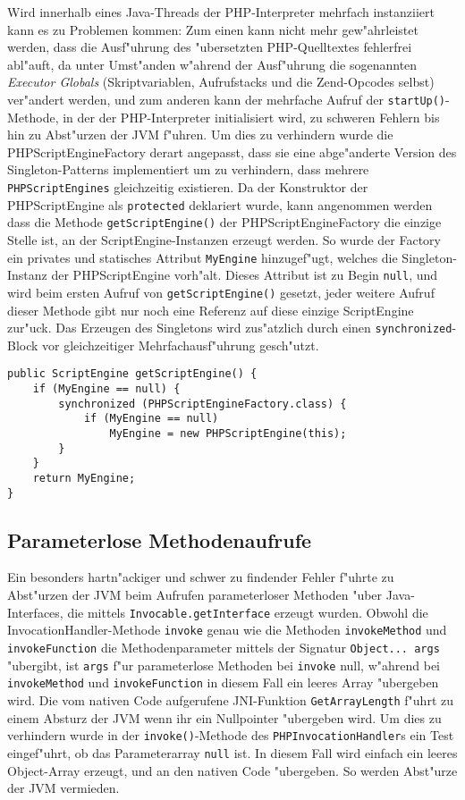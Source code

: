 Wird innerhalb eines Java-Threads der PHP-Interpreter mehrfach instanziiert kann es zu Problemen
kommen: Zum einen kann nicht mehr gew"ahrleistet werden, dass die Ausf"uhrung des "ubersetzten
PHP-Quelltextes fehlerfrei abl"auft, da unter Umst"anden w"ahrend der Ausf"uhrung die sogenannten
\emph{Executor Globals} (Skriptvariablen, Aufrufstacks und die Zend-Opcodes selbst) ver"andert werden,
und zum anderen kann der mehrfache Aufruf der \texttt{startUp()}-Methode, in der der PHP-Interpreter
initialisiert wird, zu schweren Fehlern bis hin zu Abst"urzen der JVM f"uhren. Um dies zu verhindern
wurde die PHPScriptEngineFactory derart angepasst, dass sie eine abge"anderte Version des Singleton-Patterns
implementiert um zu verhindern, dass mehrere \texttt{PHPScriptEngines} gleichzeitig existieren. 
Da der Konstruktor der PHPScriptEngine als \texttt{protected} deklariert wurde, kann angenommen werden dass die 
Methode \texttt{getScriptEngine()} der PHPScriptEngineFactory die einzige Stelle ist, an der
ScriptEngine-Instanzen erzeugt werden. So wurde der Factory ein privates und statisches Attribut \texttt{MyEngine} 
hinzugef"ugt, welches die Singleton-Instanz der PHPScriptEngine vorh"alt. Dieses Attribut ist zu Begin
\texttt{null}, und wird beim ersten Aufruf von \texttt{getScriptEngine()} gesetzt, jeder weitere Aufruf
dieser Methode gibt nur noch eine Referenz auf diese einzige ScriptEngine zur"uck. Das Erzeugen des
Singletons wird zus"atzlich durch einen \texttt{synchronized}-Block vor gleichzeitiger
Mehrfachausf"uhrung gesch"utzt.

\begin{lstlisting}[caption=Singleton-Erzeugung]
public ScriptEngine getScriptEngine() {
    if (MyEngine == null) {
        synchronized (PHPScriptEngineFactory.class) {
            if (MyEngine == null)
                MyEngine = new PHPScriptEngine(this);
        }
    }
    return MyEngine;
}
\end{lstlisting}

\subsection{Parameterlose Methodenaufrufe}
\label{sec:chap2:turp:params}

Ein besonders hartn"ackiger und schwer zu findender Fehler f"uhrte zu Abst"urzen der JVM beim Aufrufen
parameterloser Methoden "uber Java-Interfaces, die mittels \texttt{Invocable.getInterface} erzeugt wurden.
Obwohl die InvocationHandler-Methode \texttt{invoke} genau wie die Methoden \texttt{invokeMethod} und \texttt{invokeFunction}
die Methodenparameter mittels der Signatur \texttt{Object... args} "ubergibt, ist \texttt{args} f"ur parameterlose Methoden
bei \texttt{invoke} null, w"ahrend bei \texttt{invokeMethod} und \texttt{invokeFunction} in diesem Fall ein leeres Array 
"ubergeben wird. Die vom nativen Code aufgerufene JNI-Funktion \texttt{GetArrayLength} f"uhrt zu einem Absturz der
JVM wenn ihr ein Nullpointer "ubergeben wird. Um dies zu verhindern wurde in der \texttt{invoke()}-Methode des
\texttt{PHPInvocationHandler}s ein Test eingef"uhrt, ob das Parameterarray \texttt{null} ist. In diesem Fall wird einfach
ein leeres Object-Array erzeugt, und an den nativen Code "ubergeben. So werden Abst"urze der JVM vermieden. 

